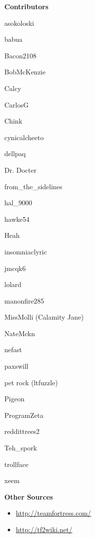 {\bf Contributors}
\begin{packed_item}
\item asokoloski
\item babua
\item Bacon2108
\item BobMcKenzie
\item Calcy
\item CarlosG
\item Chink
\item cynicalcheeto
\item dellpaq
\item Dr. Docter
\item from\_the\_sidelines
\item hal\_9000
\item hawke54
\item Heah
\item insomniaclyric
\item jmcqk6
\item lolard
\item manonfire285
\item MissMolli (Calamity Jane)
\item NateMckn
\item nefast
\item paxswill
\item pet rock (ltfuzzle)
\item Pigeon
\item ProgramZeta
\item reddittrees2
\item Teh\_spork
\item trollface
\item xeem
\end{packed_item}

 
{\bf Other Sources}
\begin{itemize}
\item \url{http://teamfortress.com/}
\item \url{http://tf2wiki.net/}
\end{itemize}